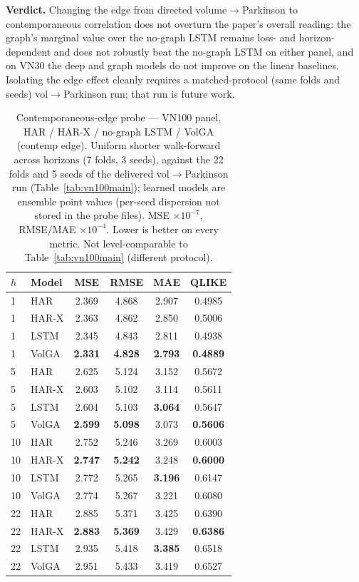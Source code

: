\documentclass[runningheads]{llncs}
\begin{document}
\textbf{Verdict.} Changing the edge from directed volume$\to$Parkinson to contemporaneous correlation
does not overturn the paper's overall reading: the graph's marginal value over the no-graph LSTM
remains loss- and horizon-dependent and does not robustly beat the no-graph LSTM on either panel, and
on VN30 the deep and graph models do not improve on the linear baselines. Isolating the edge effect
cleanly requires a matched-protocol (same folds and seeds) vol$\to$Parkinson run; that run is future
work.

\begin{table}[t]
\centering
\caption{Contemporaneous-edge probe --- VN100 panel, HAR / HAR-X / no-graph LSTM / VolGA (contemp
edge). Uniform shorter walk-forward across horizons (7 folds, 3 seeds), against the 22 folds and 5
seeds of the delivered vol$\to$Parkinson run (Table~\ref{tab:vn100main}); learned models are ensemble
point values (per-seed dispersion not stored in the probe files). MSE $\times10^{-7}$, RMSE/MAE
$\times10^{-4}$. Lower is better on every metric. Not level-comparable to Table~\ref{tab:vn100main}
(different protocol).}
\label{tab:edgemetrics}
\footnotesize
\setlength{\tabcolsep}{6pt}
\begin{tabular}{llcccc}
\toprule
$h$ & Model & MSE & RMSE & MAE & QLIKE \\
\midrule
1 & HAR   & 2.369 & 4.868 & 2.907 & 0.4985 \\
1 & HAR-X & 2.363 & 4.862 & 2.850 & 0.5006 \\
1 & LSTM  & 2.345 & 4.843 & 2.811 & 0.4938 \\
1 & VolGA & \textbf{2.331} & \textbf{4.828} & \textbf{2.793} & \textbf{0.4889} \\
\midrule
5 & HAR   & 2.625 & 5.124 & 3.152 & 0.5672 \\
5 & HAR-X & 2.603 & 5.102 & 3.114 & 0.5611 \\
5 & LSTM  & 2.604 & 5.103 & \textbf{3.064} & 0.5647 \\
5 & VolGA & \textbf{2.599} & \textbf{5.098} & 3.073 & \textbf{0.5606} \\
\midrule
10 & HAR   & 2.752 & 5.246 & 3.269 & 0.6003 \\
10 & HAR-X & \textbf{2.747} & \textbf{5.242} & 3.248 & \textbf{0.6000} \\
10 & LSTM  & 2.772 & 5.265 & \textbf{3.196} & 0.6147 \\
10 & VolGA & 2.774 & 5.267 & 3.221 & 0.6080 \\
\midrule
22 & HAR   & 2.885 & 5.371 & 3.425 & 0.6390 \\
22 & HAR-X & \textbf{2.883} & \textbf{5.369} & 3.429 & \textbf{0.6386} \\
22 & LSTM  & 2.935 & 5.418 & \textbf{3.385} & 0.6518 \\
22 & VolGA & 2.951 & 5.433 & 3.419 & 0.6527 \\
\bottomrule
\end{tabular}
\end{table}
\end{document}
